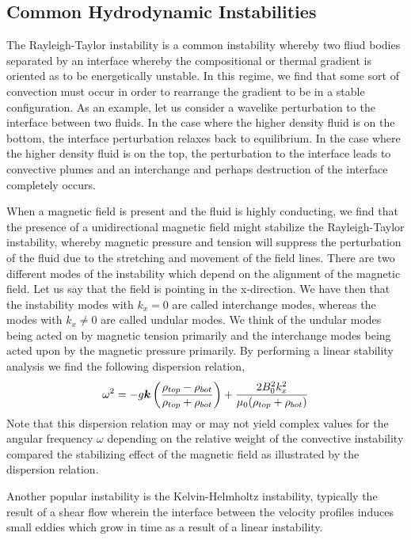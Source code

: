 \documentclass{article}
\begin{document}
\subsection{Common Hydrodynamic Instabilities}
The Rayleigh-Taylor instability is a common instability whereby two fliud bodies
separated by an interface whereby the compositional or thermal gradient is
oriented as to be energetically unstable. In this regime, we find that some sort
of convection must occur in order to rearrange the gradient to be in a stable
configuration. As an example, let us consider a wavelike perturbation to the
interface between two fluids. In the case where the higher density fluid is on
the bottom, the interface perturbation relaxes back to equilibrium. In the case
where the higher density fluid is on the top, the perturbation to the interface
leads to convective plumes and an interchange and perhaps destruction of the
interface completely occurs. 

When a magnetic field is present and the fluid is highly conducting, we find
that the presence of a unidirectional magnetic field might stabilize the
Rayleigh-Taylor instability, whereby magnetic pressure and tension will suppress
the perturbation of the fluid due to the stretching and movement of the field
lines. There are two different modes of the instability which depend on the
alignment of the magnetic field. Let us say that the field is pointing in the
x-direction. We have then that the instability modes with $k_x = 0$ are called
interchange modes, whereas the modes with $k_x \ne  0$ are called undular modes. We
think of the undular modes being acted on by magnetic tension primarily and the
interchange modes being acted upon by the magnetic pressure primarily. By
performing a linear stability analysis we find the following dispersion
relation, 
\begin{gather*}
    \omega^2 = -g\boldsymbol{k}\left(\frac{\rho_{top} - \rho_{bot}}{\rho_{top} +
    \rho_{bot}}\right) + \frac{2B_0^2k_x^2}{\mu_0(\rho_{top}+\rho_{bot})}
\end{gather*}
Note that this dispersion relation may or may not yield complex values for the
angular frequency $\omega$ depending on the relative weight of the convective
instability compared the stabilizing effect of the magnetic field as illustrated
by the dispersion relation. 

Another popular instability is the Kelvin-Helmholtz instability, typically the result of a shear flow wherein the
interface between the velocity profiles induces small eddies which grow in time
as a result of a linear instability. 
\end{document}
